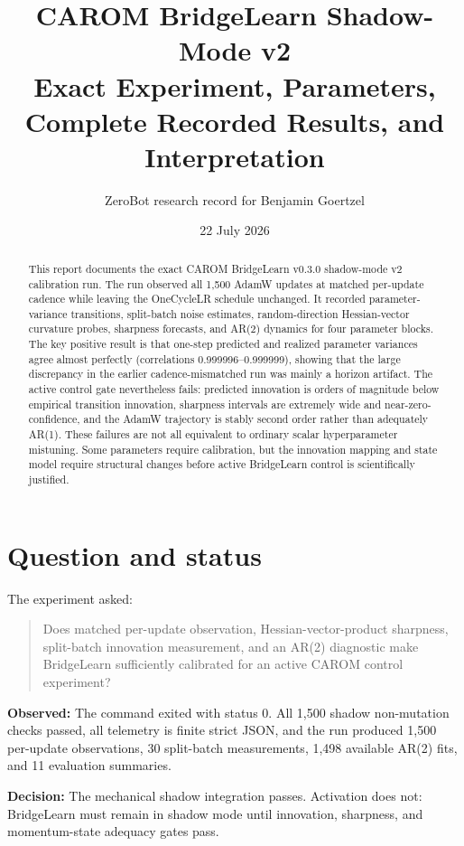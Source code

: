 \documentclass[10pt,letterpaper]{article}
\title{\textbf{CAROM BridgeLearn Shadow-Mode v2}\\
Exact Experiment, Parameters, Complete Recorded Results, and Interpretation}
\author{ZeroBot research record for Benjamin Goertzel}
\date{22 July 2026}
\newcommand{\obs}{\textbf{Observed:} }
\newcommand{\decision}{\textbf{Decision:} }
\begin{document}
\maketitle

\begin{abstract}
This report documents the exact CAROM BridgeLearn v0.3.0 shadow-mode v2
calibration run.  The run observed all 1,500 AdamW updates at matched
per-update cadence while leaving the OneCycleLR schedule unchanged.  It
recorded parameter-variance transitions, split-batch noise estimates,
random-direction Hessian-vector curvature probes, sharpness forecasts, and
AR(2) dynamics for four parameter blocks.  The key positive result is that
one-step predicted and realized parameter variances agree almost perfectly
(correlations 0.999996--0.999999), showing that the large discrepancy in the
earlier cadence-mismatched run was mainly a horizon artifact.  The active
control gate nevertheless fails: predicted innovation is orders of magnitude
below empirical transition innovation, sharpness intervals are extremely
wide and near-zero-confidence, and the AdamW trajectory is stably second
order rather than adequately AR(1).  These failures are not all equivalent
to ordinary scalar hyperparameter mistuning.  Some parameters require
calibration, but the innovation mapping and state model require structural
changes before active BridgeLearn control is scientifically justified.
\end{abstract}

\tableofcontents

\section{Question and status}

The experiment asked:
\begin{quote}
Does matched per-update observation, Hessian-vector-product sharpness,
split-batch innovation measurement, and an AR(2) diagnostic make BridgeLearn
sufficiently calibrated for an active CAROM control experiment?
\end{quote}

\obs The command exited with status 0.  All 1,500 shadow non-mutation checks
passed, all telemetry is finite strict JSON, and the run produced 1,500
per-update observations, 30 split-batch measurements, 1,498 available AR(2)
fits, and 11 evaluation summaries.

\decision The mechanical shadow integration passes.  Activation does not:
BridgeLearn must remain in shadow mode until innovation, sharpness, and
momentum-state adequacy gates pass.
\end{document}
